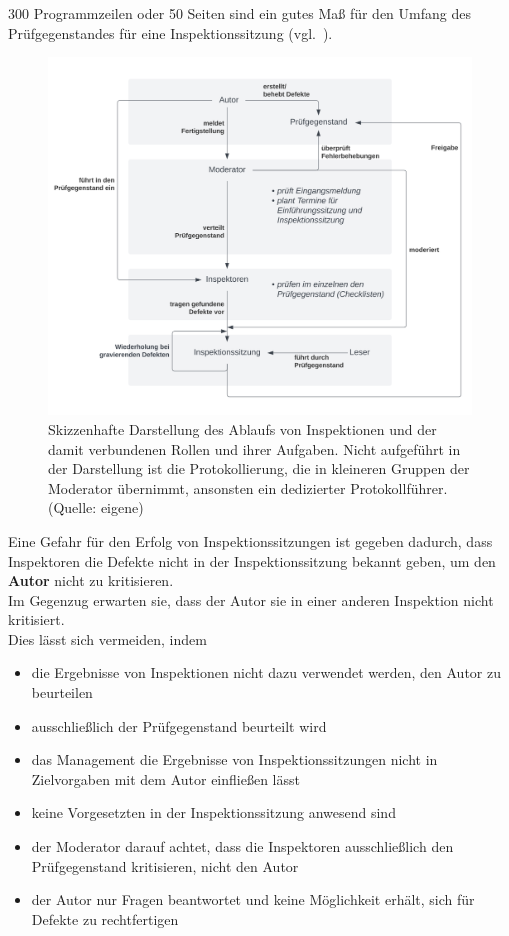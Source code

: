 \begin{tcolorbox}[colback=white]
300 Programmzeilen oder 50 Seiten sind ein gutes Maß für den Umfang des Prüfgegenstandes für eine Inspektionssitzung (vgl.~\cite[20]{Wed09c}).\\
\end{tcolorbox}


\begin{figure}
    \centering
    \includegraphics[scale=0.4]{part four/Manuelle Verfahren/img/inspektion}
    \caption{Skizzenhafte Darstellung des Ablaufs von Inspektionen und der damit verbundenen Rollen und ihrer Aufgaben. Nicht aufgeführt in der Darstellung ist die Protokollierung, die in kleineren Gruppen der Moderator übernimmt, ansonsten ein dedizierter Protokollführer. (Quelle: eigene)}
    \label{fig:inspektion}
\end{figure}


\noindent
Eine Gefahr für den Erfolg von Inspektionssitzungen ist gegeben dadurch, dass Inspektoren die Defekte nicht in der Inspektionssitzung bekannt geben, um den \textbf{Autor} nicht zu kritisieren.\\
Im Gegenzug erwarten sie, dass der Autor sie in einer anderen Inspektion nicht kritisiert.\\
Dies lässt sich vermeiden, indem

\begin{itemize}
    \item die Ergebnisse von Inspektionen nicht dazu verwendet werden, den Autor zu beurteilen
    \item ausschließlich der Prüfgegenstand beurteilt wird
    \item das Management die Ergebnisse von Inspektionssitzungen nicht in Zielvorgaben mit dem Autor einfließen lässt
    \item keine Vorgesetzten in der Inspektionssitzung anwesend sind
    \item der Moderator darauf achtet, dass die Inspektoren ausschließlich den Prüfgegenstand kritisieren, nicht den Autor
    \item der Autor nur Fragen beantwortet und keine Möglichkeit erhält, sich für Defekte zu rechtfertigen
\end{itemize}

